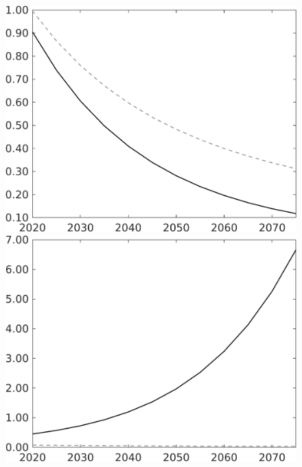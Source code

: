 \documentclass[12pt]{article}
\begin{document}
\begin{figure}[h!!]
\begin{minipage}[]{0.32\textwidth}
	\end{minipage}
	\begin{minipage}[]{0.32\textwidth}
		\includegraphics[width=1\textwidth]{../../codding_model/own_basedOnFried/optimalPol_010922_revision/figures/all_13Sept22/LevTaufNoTauf_TaulCalib_Equlab_regime0_pg_spillover0_nsk0_xgr0_knspil1_sep1_LFlimit0_emsbase0_countec0_GovRev0_etaa0.79_lgd0.png}
	\end{minipage}	
	\begin{minipage}[]{0.32\textwidth}
		\includegraphics[width=1\textwidth]{../../codding_model/own_basedOnFried/optimalPol_010922_revision/figures/all_13Sept22/LevTaufNoTauf_TaulCalib_Equlab_regime0_GFF_spillover0_nsk0_xgr0_knspil1_sep1_LFlimit0_emsbase0_countec0_GovRev0_etaa0.79_lgd0.png}

\end{minipage}
\end{figure}
\end{document}

